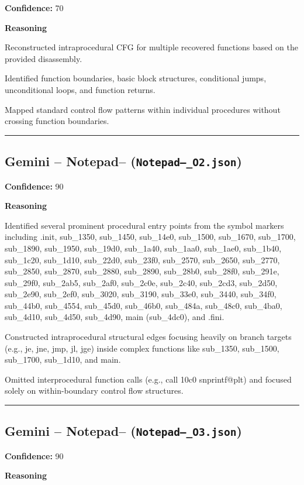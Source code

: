 \textbf{Confidence:} 70

\textbf{Reasoning}

Reconstructed intraprocedural CFG for multiple recovered functions based on the provided disassembly.

Identified function boundaries, basic block structures, conditional jumps, unconditional loops, and function returns.

Mapped standard control flow patterns within individual procedures without crossing function boundaries.

\bigskip
\hrule
\bigskip

\subsection{Gemini -- Notepad-- (\texttt{Notepad--\_O2.json})}

\textbf{Confidence:} 90

\textbf{Reasoning}

Identified several prominent procedural entry points from the symbol markers including .init, sub\_1350, sub\_1450, sub\_14e0, sub\_1500, sub\_1670, sub\_1700, sub\_1890, sub\_1950, sub\_19d0, sub\_1a40, sub\_1aa0, sub\_1ae0, sub\_1b40, sub\_1c20, sub\_1d10, sub\_22d0, sub\_23f0, sub\_2570, sub\_2650, sub\_2770, sub\_2850, sub\_2870, sub\_2880, sub\_2890, sub\_28b0, sub\_28f0, sub\_291e, sub\_29f0, sub\_2ab5, sub\_2af0, sub\_2c0e, sub\_2c40, sub\_2cd3, sub\_2d50, sub\_2e90, sub\_2ef0, sub\_3020, sub\_3190, sub\_33e0, sub\_3440, sub\_34f0, sub\_44b0, sub\_4554, sub\_45d0, sub\_46b0, sub\_484a, sub\_48c0, sub\_4ba0, sub\_4d10, sub\_4d50, sub\_4d90, main (sub\_4dc0), and .fini.

Constructed intraprocedural structural edges focusing heavily on branch targets (e.g., je, jne, jmp, jl, jge) inside complex functions like sub\_1350, sub\_1500, sub\_1700, sub\_1d10, and main.

Omitted interprocedural function calls (e.g., call 10c0 snprintf@plt) and focused solely on within-boundary control flow structures.

\bigskip
\hrule
\bigskip

\subsection{Gemini -- Notepad-- (\texttt{Notepad--\_O3.json})}

\textbf{Confidence:} 90

\textbf{Reasoning}


